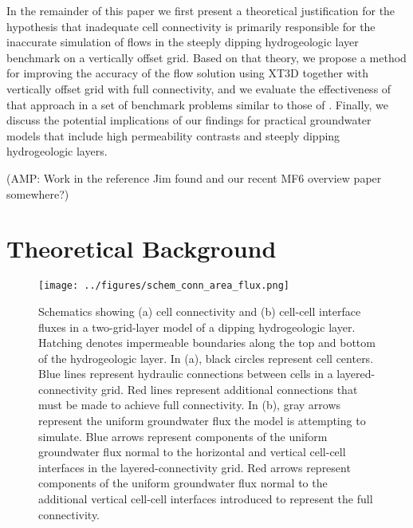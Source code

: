 \documentclass{article}
\begin{document}
In the remainder of this paper we first present a theoretical justification for the hypothesis that inadequate cell connectivity is primarily responsible for the inaccurate simulation of flows in the steeply dipping hydrogeologic layer benchmark on a vertically offset grid. Based on that theory, we propose a method for improving the accuracy of the flow solution using XT3D together with vertically offset grid with full connectivity, and we evaluate the effectiveness of that approach in a set of benchmark problems similar to those of \cite{bardot2022}. Finally, we discuss the potential implications of our findings for practical groundwater models that include high permeability contrasts and steeply dipping hydrogeologic layers.

{\color{red} (AMP: Work in the reference Jim found and our recent MF6 overview paper somewhere?)}

\section{Theoretical Background}

\begin{figure}
	\begin{center}
	\texttt{[image: ../figures/schem\_conn\_area\_flux.png]}
	\caption{Schematics showing (a) cell connectivity and (b) cell-cell interface fluxes in a two-grid-layer model of a dipping hydrogeologic layer. Hatching denotes impermeable boundaries along the top and bottom of the hydrogeologic layer. In (a), black circles represent cell centers. Blue lines represent hydraulic connections between cells in a layered-connectivity grid. Red lines represent additional connections that must be made to achieve full connectivity. In (b), gray arrows represent the uniform groundwater flux the model is attempting to simulate. Blue arrows represent components of the uniform groundwater flux normal to the horizontal and vertical cell-cell interfaces in the layered-connectivity grid. Red arrows represent components of the uniform groundwater flux normal to the additional vertical cell-cell interfaces introduced to represent the full connectivity.}
	\label{fig:schem-conn-area-flux}
	\end{center}
\end{figure}
\end{document}
